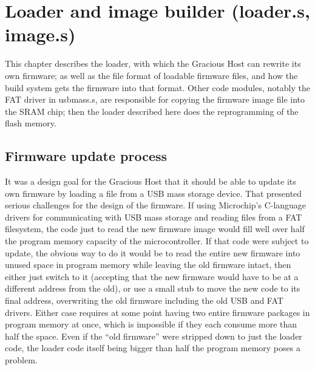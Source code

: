 
%
%
%
%
%
%

\chapter{Loader and image builder (loader.s, image.s)}

This chapter describes the loader, with which the Gracious Host can rewrite
its own firmware; as well as the file format of loadable firmware files, and
how the build system gets the firmware into that format.  Other code
modules, notably the FAT driver in usbmass.s, are responsible for copying
the firmware image file into the SRAM chip; then the loader described here
does the reprogramming of the flash memory.

\section{Firmware update process}

It was a design goal for the Gracious Host that it should be able to update
its own firmware by loading a file from a USB mass storage device.  That
presented serious challenges for the design of the firmware.  If using
Microchip's C-language drivers for communicating with USB mass storage and
reading files from a FAT filesystem, the code just to read the new
firmware image would fill well over half the program memory capacity of the
microcontroller.  If that code were subject to update, the obvious way to do
it would be to read the entire new firmware into unused space in program
memory while leaving the old firmware intact, then either just switch to it
(accepting that the new firmware would have to be at a different address
from the old), or use a small stub to move the new code to its final
address, overwriting the old firmware including the old USB and FAT drivers. 
Either case requires at some point having two entire firmware packages in
program memory at once, which is impossible if they each consume more than
half the space.  Even if the ``old firmware'' were stripped down to just the
loader code, the loader code itself being bigger than half the program
memory poses a problem.

